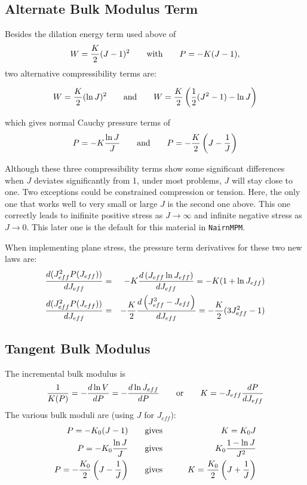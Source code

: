 \documentclass[11pt]{book}
\def\Jeff{J_{eff}}
\begin{document}
\subsection{Alternate Bulk Modulus Term\label{PTerms}}

Besides the dilation energy term used above of
\begin{equation}
W = {K\over2}(J-1)^2  \qquad{\rm with}\qquad P = -K (J-1),
\end{equation}
two alternative compressibility terms are:

\begin{equation}
W = {K\over2}(\ln J)^2  \qquad{\rm and}\qquad W = {K\over2}\left({1\over2}(J^2-1) - \ln J\right)
\end{equation}

\noindent which gives normal Cauchy pressure terms of
\begin{equation}
     P = -K {\ln J\over J}  \qquad{\rm and}\qquad P = - {K\over 2}\left(J-{1\over J}\right)
\end{equation}

\noindent Although these three compressibility terms show some significant differences when $J$ deviates significantly from 1, under most problems, $J$ will stay close to one. Two exceptions could be constrained compression or tension. Here, the only one that works well to very small or large $J$ is the second one above. This one correctly leads to inifinite positive stress as $J\to\infty$ and infinite negative stress as $J\to0$. This later one is the default for this material in {\tt NairnMPM}.

When implementing plane stress, the pressure term derivatives for these two new laws are:
\begin{eqnarray}
      {d(\Jeff^2 P(\Jeff))\over d\Jeff} & = & -K{d \left(J_{eff}\ln J_{eff}\right)\over dJ_{eff}} = -K(1+\ln J_{eff}) \\
      {d(\Jeff^2 P(\Jeff))\over d\Jeff} & = & -{K\over 2}{d \left(J_{eff}^3 - J_{eff}\right)\over dJ_{eff}} =  -{K\over 2}(3J_{eff}^2-1)
\end{eqnarray}

\subsection{Tangent Bulk Modulus}

The incremental bulk modulus is
\begin{equation}
   {1\over K(P)} = - {d\ln V\over dP} = - {d\ln \Jeff\over dP}  \qquad{\rm or} \qquad K = -\Jeff {dP\over d\Jeff}
\end{equation}
The various bulk moduli are (using $J$ for $\Jeff$):
\begin{eqnarray}
   P = -K_0(J-1) &\qquad{\rm gives}\qquad & K = K_0 J \\
   P = -K_0 {\ln J\over J} &\qquad{\rm gives}\qquad& K_0{1-\ln J \over J ^2}\\
   P = - {K_0\over 2}\left(J -{1\over J }\right) &\qquad{\rm gives}\qquad& K = {K_0\over 2}\left(J  + {1\over J }\right)
\end{eqnarray}
\end{document}
